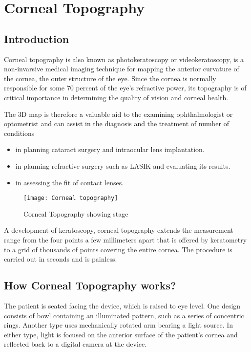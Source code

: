 \documentclass[12pt]{article}
\begin{document}
\clearpage

\section{Corneal Topography}

\subsection{Introduction}
Corneal topography is also known as photokeratoscopy or videokeratoscopy, is a non-invarsive medical imaging technique for mapping the anterior curvature of the cornea, the outer structure of the eye. Since the cornea is normally responsible for some 70 percent of the eye's refractive power, its topography is of critical importance in determining the quality of vision and corneal health.

The 3D map is therefore a valuable aid to the examining ophthalmologist or optometrist and can assist in the diagnosis and the treatment of number of conditions
\begin{itemize}
\item in planning cataract surgery and intraocular lens implantation.
\item in planning refractive surgery such as LASIK and evaluating its results.
\item in assessing the fit of contact lenses.
\end{itemize}
\begin{figure}[ht]
\centering
\texttt{[image: Corneal topography]}
\caption{Corneal Topography showing stage}
\end{figure}
A development of keratoscopy, corneal topography extends the measurement range from the four points a few millimeters apart that is offered by keratometry to a grid of thousands of points covering the entire cornea. The procedure is carried out in seconds and is painless.

\subsection{How Corneal Topography works?}
The patient is seated facing the device, which is raised to eye level. One design consists of bowl containing an illuminated pattern, such as a series of concentric rings. Another type uses mechanically rotated arm bearing a light source. In either type, light is focused on the anterior surface of the patient's cornea and reflected back to a digital camera at the device.
\end{document}
